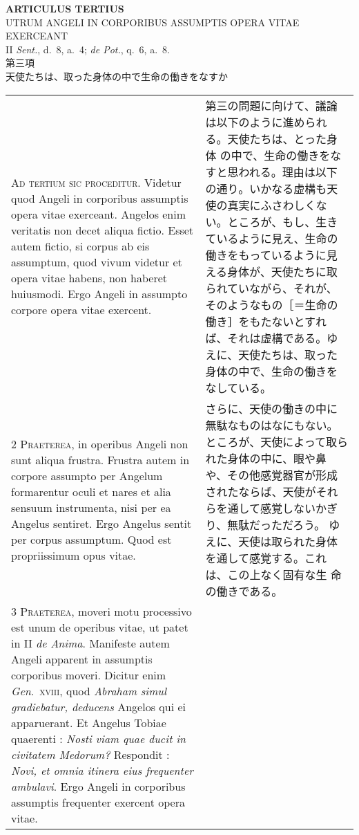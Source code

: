 \documentclass[10pt]{jsarticle} %
\begin{document}
\begin{center}
 {\Large {\bf ARTICULUS TERTIUS}}\\
 {\large UTRUM ANGELI IN CORPORIBUS ASSUMPTIS OPERA VITAE EXERCEANT}\\
 {\footnotesize II {\itshape Sent.}, d.~8, a.~4; {\itshape de Pot.},
 q.~6, a.~8.}\\
 {\Large 第三項\\天使たちは、取った身体の中で生命の働きをなすか}
\end{center}

\begin{longtable}{p{21em}p{21em}}


{\huge A}{\scshape d tertium sic proceditur}. Videtur quod
Angeli in corporibus assumptis opera vitae exerceant. Angelos enim
veritatis non decet aliqua fictio. Esset autem fictio, si corpus ab eis
assumptum, quod vivum videtur et opera vitae habens, non haberet
huiusmodi. Ergo Angeli in assumpto corpore opera vitae exercent.

&

第三の問題に向けて、議論は以下のように進められる。天使たちは、とった身体
 の中で、生命の働きをなすと思われる。理由は以下の通り。いかなる虚構も天
 使の真実にふさわしくない。ところが、もし、生きているように見え、生命の
 働きをもっているように見える身体が、天使たちに取られていながら、それが、
 そのようなもの［＝生命の働き］をもたないとすれば、それは虚構である。ゆ
 えに、天使たちは、取った身体の中で、生命の働きをなしている。

\\


{\scshape 2 Praeterea}, in operibus Angeli non sunt
aliqua frustra. Frustra autem in corpore assumpto per Angelum
formarentur oculi et nares et alia sensuum instrumenta, nisi per ea
Angelus sentiret. Ergo Angelus sentit per corpus assumptum. Quod est
propriissimum opus vitae.

&
さらに、天使の働きの中に無駄なものはなにもない。
ところが、天使によって取られた身体の中に、眼や鼻や、その他感覚器官が形成
 されたならば、天使がそれらを通して感覚しないかぎり、無駄だっただろう。
 ゆえに、天使は取られた身体を通して感覚する。これは、この上なく固有な生
 命の働きである。

\\


{\scshape 3 Praeterea}, moveri motu processivo est unum
de operibus vitae, ut patet in II {\itshape de Anima}. Manifeste autem Angeli
apparent in assumptis corporibus moveri. Dicitur enim {\itshape Gen}.~{\scshape xviii}, quod
{\itshape Abraham simul gradiebatur, deducens} Angelos qui ei apparuerant. Et
Angelus Tobiae quaerenti : {\itshape Nosti viam quae ducit in civitatem Medorum?}
Respondit : {\itshape Novi, et omnia itinera eius frequenter ambulavi}. Ergo Angeli
in corporibus assumptis frequenter exercent opera vitae.


\end{longtable}
\end{document}
